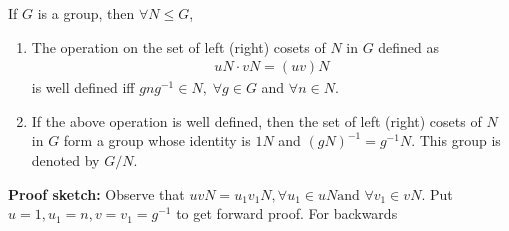 \documentclass[titlepage, 12pt]{article}
\begin{document}
\begin{proposition}{}{}
    If $G$ is a group, then $\forall N\le G$,
    \begin{enumerate}
        \item The operation on the set of left (right) cosets of $N$ in $G$ defined as
            \begin{gather*}
                uN\cdot vN = (uv)N
            \end{gather*}
            is well defined iff $gng^{-1}\in N,\;\forall g\in G$ and $\forall
            n\in N$.
        \item If the above operation is well defined, then the set of left (right)
            cosets of $N$ in $G$ form a group whose identity is $1N$ and
            $(gN)^{-1} = g^{-1}N$. This group is denoted by $G/N$.
    \end{enumerate}
\end{proposition}
\textbf{Proof sketch:} Observe that $uvN = u_1v_1N, \forall u_1\in uN \textrm{
and } \forall v_1\in vN$. Put $u = 1, u_1 = n, v = v_1 = g^{-1}$ to get forward
proof. For backwards
\end{document}
